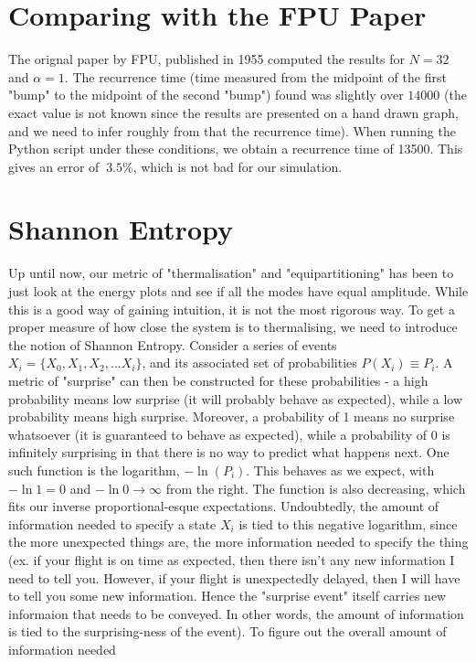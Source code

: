 \documentclass{article}
\begin{document}
\section{Comparing with the FPU Paper}
The orignal paper by FPU, published in 1955 computed the results for 
$N=32$ and $\alpha=1$. The recurrence time (time measured from the midpoint of 
the first "bump" to the midpoint of the second "bump") found was slightly over 
$14000$ (the exact value is not known since the results are presented
 on a hand drawn graph, and we need to infer roughly from that the recurrence time). When running the Python script 
under these conditions, we obtain a recurrence time of 13500. This gives an error of 
$~3.5\%$, 
which is not bad for our simulation. 
\section{Shannon Entropy}
Up until now, our metric of "thermalisation" and "equipartitioning" has been to just 
look at the energy plots and see if all the modes have equal amplitude. While this 
is a good way of gaining intuition, it is not the most rigorous way. To get a proper measure of how close the system is to thermalising, we need to introduce the notion 
of Shannon Entropy. Consider a series of events $X_i=\{X_0,X_1,X_2,...X_i\}$, and its associated set of 
probabilities $P(X_i)\equiv P_i$. A metric of "surprise" can then be constructed for these 
probabilities - a high probability means low surprise (it will probably behave as expected), 
while a low probability means high surprise. Moreover, a probability of 1 means no surprise whatsoever (it is guaranteed to behave as expected), 
while a probability of 0 is infinitely surprising in that there is no way to predict what happens next. One such function is the 
logarithm, $-\ln (P_i)$. This behaves as we expect, with $-\ln1=0$ and $-\ln0\to\infty$ from the right. The function 
is also decreasing, which fits our inverse proportional-esque expectations. Undoubtedly, 
the amount of information needed to specify a state $X_i$ is tied to this negative logarithm, since 
the more unexpected things are, the more information needed to specify the thing 
(ex. if your flight is on time as expected, 
then there isn't any new information I need to tell you. 
However, if your flight is unexpectedly delayed, 
then I will have to tell you some new information. Hence the
 "surprise event" itself carries 
new informaion that needs to be conveyed. 
In other words, the amount of information is tied to 
the surprising-ness of the event). To figure out the overall amount of information needed 
\end{document}
